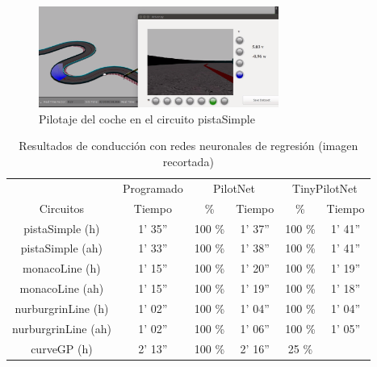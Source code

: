 \begin{figure}[H]
\begin{center}
	\includegraphics[width=0.7\textwidth]{figures/Regresion/pilotnet_cropped.png}
   \caption{Pilotaje del coche en el circuito pistaSimple}
	\label{fig.simple_reg}
\end{center}
\end{figure}

\begin{table}[H]
\centering
\caption{Resultados de conducción con redes neuronales de regresión (imagen recortada)}
\label{resultados_regresion_recortada}
\begin{tabular}{c|c|c|c|c|c|}
\cline{2-6}
                          & \multicolumn{1}{c|}{Programado} & \multicolumn{2}{c|}{PilotNet} & \multicolumn{2}{c|}{TinyPilotNet} \\ \cline{1-6} 
                        \multicolumn{1}{|c|}{Circuitos}    & Tiempo       & \%       & Tiempo       & \%        & Tiempo         \\ \hline
\multicolumn{1}{|c|}{pistaSimple (h)}    & 1' 35''           & 100 \%         & 1' 37''       &  100 \%        & 1' 41''               \\ \hline
\multicolumn{1}{|c|}{pistaSimple (ah)}     & 1' 33''           & 100 \%          & 1' 38''           & 100 \%        & 1' 41''      \\ \hline
\multicolumn{1}{|c|}{monacoLine (h)}      & 1' 15''           & 100 \%            & 1' 20''            & 100 \%         & 1' 19''                \\ \hline
\multicolumn{1}{|c|}{monacoLine (ah)}       & 1' 15''       &  100 \%      & 1' 19''         & 100 \%          & 1' 18''         \\ \hline
\multicolumn{1}{|c|}{nurburgrinLine (h)}      & 1' 02''       &  100 \%         & 1' 04''           & 100 \%        & 1' 04''       \\ \hline
\multicolumn{1}{|c|}{nurburgrinLine (ah)}       & 1' 02''     & 100 \%         & 1' 06''          & 100 \%     & 1' 05''            \\ \hline
\multicolumn{1}{|c|}{curveGP (h)}     & 2' 13''           & 100 \%         & 2' 16''            & 25 \%        &              \\ \hline

\end{tabular}
\end{table}
